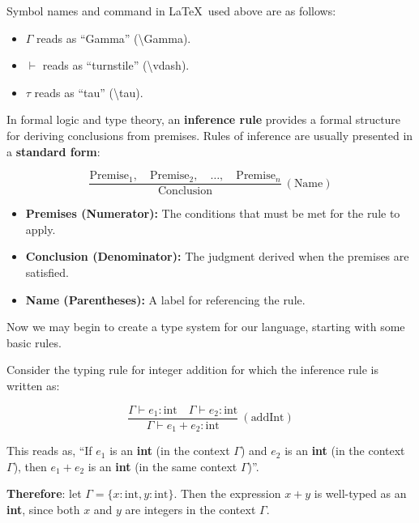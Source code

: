 \vspace{-1em}
\begin{Tip}
    Symbol names and command in \LaTeX \ used above are as follows:
    \begin{itemize}
        \item $\Gamma$ reads as ``Gamma'' (\textbackslash Gamma).
        \item $\vdash$ reads as ``turnstile'' (\textbackslash vdash).
        \item $\tau$ reads as ``tau'' (\textbackslash tau).
    \end{itemize}
\end{Tip}

\newpage 

\begin{Def}

    In formal logic and type theory, an \textbf{inference rule} provides a formal structure for deriving conclusions from premises. 
    Rules of inference are usually presented in a \textbf{standard form}: \Large

    \[
    \frac{\text{Premise}_1, \quad \text{Premise}_2, \quad \ldots, \quad \text{Premise}_n}{\text{Conclusion}} \ (\text{Name})
    \]

    \normalsize
    \begin{itemize}
        \item \textbf{Premises (Numerator):} The conditions that must be met for the rule to apply.
        \item \textbf{Conclusion (Denominator):} The judgment derived when the premises are satisfied.
        \item \textbf{Name (Parentheses):} A label for referencing the rule. \hfill \cite{wiki:rule_of_inference}
    \end{itemize}
\end{Def}

\noindent
Now we may begin to create a type system for our language, starting with some basic rules.
\begin{Example}

    \label{ex:integer_addition}
    Consider the typing rule for integer addition for which the inference rule is written as: \LARGE

    \[
    \frac{\Gamma \vdash e_1 : \text{int} \quad \Gamma \vdash e_2 : \text{int}}{\Gamma \vdash e_1 + e_2 : \text{int}} \ (\text{addInt})
    \]

    \vspace{.5em}
    \normalsize
    \noindent
    This reads as, ``If $e_1$ is an \textbf{int} (in the context $\Gamma$) and $e_2$ is an \textbf{int} 
    (in the context $\Gamma$), then $e_1 + e_2$ is an \textbf{int} (in the same context $\Gamma$)''.

    \vspace{1em}
    \noindent
    \textbf{Therefore}: let $\Gamma = \{x : \text{int}, y : \text{int}\}$. Then the expression $x + y$ is well-typed as an \textbf{int}, 
    since both $x$ and $y$ are integers in the context $\Gamma$.
\end{Example}

